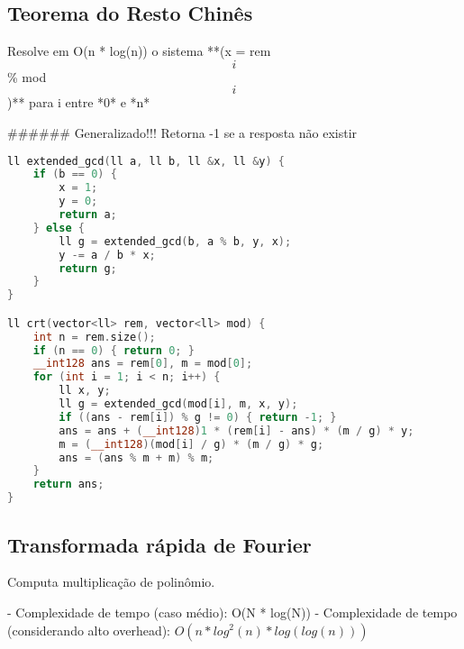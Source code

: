 \documentclass[11pt, a4paper, twoside]{article}
\begin{document}
\subsection{Teorema do Resto Chinês}


Resolve em O(n * log(n)) o sistema **(x = rem\[i\] \% mod\[i\])** para i entre *0* e *n*

\#\#\#\#\#\# Generalizado!!! Retorna -1 se a resposta não existir

\begin{lstlisting}[language=C++]
ll extended_gcd(ll a, ll b, ll &x, ll &y) {
    if (b == 0) {
        x = 1;
        y = 0;
        return a;
    } else {
        ll g = extended_gcd(b, a % b, y, x);
        y -= a / b * x;
        return g;
    }
}

ll crt(vector<ll> rem, vector<ll> mod) {
    int n = rem.size();
    if (n == 0) { return 0; }
    __int128 ans = rem[0], m = mod[0];
    for (int i = 1; i < n; i++) {
        ll x, y;
        ll g = extended_gcd(mod[i], m, x, y);
        if ((ans - rem[i]) % g != 0) { return -1; }
        ans = ans + (__int128)1 * (rem[i] - ans) * (m / g) * y;
        m = (__int128)(mod[i] / g) * (m / g) * g;
        ans = (ans % m + m) % m;
    }
    return ans;
}
\end{lstlisting}

\subsection{Transformada rápida de Fourier}



Computa multiplicação de polinômio.

- Complexidade de tempo (caso médio): O(N * log(N))
- Complexidade de tempo (considerando alto overhead): $O(n * log^2(n) * log(log(n)))$
\end{document}
